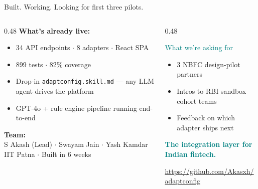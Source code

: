 \documentclass[aspectratio=169,11pt]{beamer}
\begin{document}
\begin{frame}{Built. Working. Looking for first three pilots.}
\vspace{0.3em}
\begin{columns}[T]
\begin{column}{0.48\textwidth}
\textbf{What's already live:}
\begin{itemize}
\item 34 API endpoints $\cdot$ 8 adapters $\cdot$ React SPA
\item 899 tests $\cdot$ 82\% coverage
\item Drop-in \texttt{adaptconfig.skill.md} --- any LLM agent drives the platform
\item GPT-4o + rule engine pipeline running end-to-end
\end{itemize}

\vspace{0.4em}
\textbf{Team:}\\
{\small S Akash (Lead) $\cdot$ Swayam Jain $\cdot$ Yash Kamdar \\ IIT Patna $\cdot$ Built in 6 weeks}
\end{column}
\begin{column}{0.48\textwidth}
\begin{block}{\textcolor{teal}{What we're asking for}}
\begin{itemize}
\item 3 NBFC design-pilot partners
\item Intros to RBI sandbox cohort teams
\item Feedback on which adapter ships next
\end{itemize}
\end{block}

\vspace{0.5em}
\begin{center}
{\large \textcolor{teal}{\textbf{The integration layer for Indian fintech.}}}

\vspace{0.3em}
{\scriptsize\color{ts} \url{https://github.com/Akasxh/adaptconfig}}
\end{center}
\end{column}
\end{columns}
\end{frame}
\end{document}
